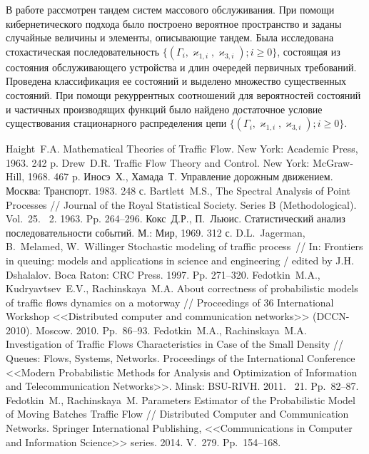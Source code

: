 \documentclass[a4paper,twoside]{article}
\theoremstyle{theorem}
\theoremstyle{remark}
\newcommand{\No}{\textnumero}
\begin{document}
В работе рассмотрен тандем систем массового обслуживания. При помощи кибернетического подхода было построено вероятное пространство и заданы случайные величины и элементы, описывающие тандем. Была исследована стохастическая последовательность $\{(\Gamma_i, \varkappa_{1,i}, \varkappa_{3,i}); i \geqslant 0\}$, состоящая из состояния обслуживающего устройства и длин очередей первичных требований. Проведена классификация ее состояний и выделено множество существенных состояний. При помощи рекуррентных соотношений для вероятностей состояний и частичных производящих функций было найдено достаточное условие существования стационарного распределения цепи  
 $\{(\Gamma_i, \varkappa_{1,i}, \varkappa_{3,i}); i \geqslant 0\}$. 

\bigskip\bigskip{}
\begin{thebibliography}{99}

 Haight~F.A. Mathematical Theories of Traffic Flow. New York: Academic Press, 1963. 242 p.
 Drew~D.R. Traffic Flow Theory and Control. New York: McGraw-Hill, 1968. 467 p.
 Иносэ~Х., Хамада~Т. Управление дорожным движением. Москва: Транспорт. 1983. 248 с.
 Bartlett~M.S., The Spectral Analysis of Point Processes // Journal of the Royal Statistical Society. Series B (Methodological). Vol.~25. \No{}~2. 1963. Pp. 264--296.
 Кокс~Д.Р., П.~Льюис. Статистический анализ последовательности событий. М.: Мир, 1969. 312 с.
 D.L.~Jagerman, B.~Melamed, W.~Willinger  Stochastic modeling of traffic process~// In: Frontiers in queuing: models and applications in science and engineering / edited by J.H. Dshalalov. Boca Raton: CRC Press. 1997. Pp. 271–320.
 Fedotkin~M.A., Kudryavtsev~E.V., Rachinskaya~M.A.  About correctness of probabilistic models of traffic flows dynamics on a motorway // Proceedings of 36 International Workshop <<Distributed computer and communication networks>> (DCCN-2010). Moscow. 2010. Pp.~86--93.
 Fedotkin~M.A., Rachinskaya~M.A. Investigation of Traffic Flows Characteristics in Case of the Small Density // Queues: Flows, Systems, Networks. Proceedings of the International Conference <<Modern Probabilistic Methods for Analysis and Optimization of Information and Telecommunication Networks>>. Minsk: BSU-RIVH. 2011. \No{}~21. Pp.~82--87.
 Fedotkin~M., Rachinskaya~M. Parameters Estimator of the Probabilistic Model of Moving Batches Traffic Flow // Distributed Computer and Communication Networks. Springer International Publishing, <<Communications in Computer and Information Science>> series. 2014. V.~279. Pp.~154--168.


\end{thebibliography}
\end{document}

